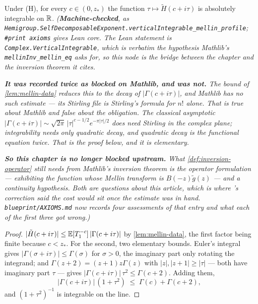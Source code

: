 \begin{lemma}\label{lem:mellin-vertical}
\leanok
Under (H), for every $c \in (0, z_*)$ the function $\tau \mapsto \tilde H(c + i\tau)$ is
absolutely integrable on $\mathbb{R}$.
\statusT\quad\emph{(\textbf{Machine-checked}, as
\texttt{Hemigroup.SelfDecomposableExponent.verticalIntegrable\_mellin\_profile};
\texttt{\#print axioms} gives Lean core. The Lean statement is
\texttt{Complex.VerticalIntegrable}, which is \emph{verbatim} the hypothesis Mathlib's
\texttt{mellinInv\_mellin\_eq} asks for, so this node is the bridge between the chapter and
the inversion theorem it cites.}

\emph{\textbf{It was recorded twice as blocked on Mathlib, and was not.} The bound of
\ref{lem:mellin-data} reduces this to the decay of $|\Gamma(c+i\tau)|$, and Mathlib has no such
estimate --- its Stirling file is Stirling's formula for $n!$ alone. That is true about Mathlib
and false about the obligation. The classical asymptotic
$|\Gamma(c+i\tau)| \sim \sqrt{2\pi}\,|\tau|^{c-1/2}e^{-\pi|\tau|/2}$ does need Stirling in the
complex plane; \emph{integrability needs only quadratic decay}, and quadratic decay is the
functional equation twice. That is the proof below, and it is elementary.}

\emph{\textbf{So this chapter is no longer blocked upstream.} What \ref{def:inversion-operator}
still needs from Mathlib's inversion theorem is the \emph{operator} formulation --- exhibiting
the function whose Mellin transform is $B(-z)\tilde g(z)$ --- and a continuity hypothesis. Both
are questions about this article, which is where 's correction said the cost would
sit once the estimate was in hand. \texttt{blueprint/AXIOMS.md} now records four assessments of
that entry and what each of the first three got wrong.)}
\end{lemma}

\begin{proof}
\leanok
$|\tilde H(c+i\tau)| \le \mathbb{E}[T_1^{-c}]\,|\Gamma(c+i\tau)|$ by \ref{lem:mellin-data}, the first
factor being finite because $c < z_*$. For the second, two elementary bounds. Euler's integral
gives $|\Gamma(\sigma+i\tau)| \le \Gamma(\sigma)$ for $\sigma > 0$, the imaginary part only rotating
the integrand; and $\Gamma(z+2) = (z+1)z\Gamma(z)$ with $|z|, |z+1| \ge |\tau|$ --- both have
imaginary part $\tau$ --- gives $|\Gamma(c+i\tau)|\,\tau^2 \le \Gamma(c+2)$. Adding them,
\[
  |\Gamma(c+i\tau)|\,(1+\tau^2) \;\le\; \Gamma(c) + \Gamma(c+2),
\]
and $(1+\tau^2)^{-1}$ is integrable on the line.
\end{proof}

